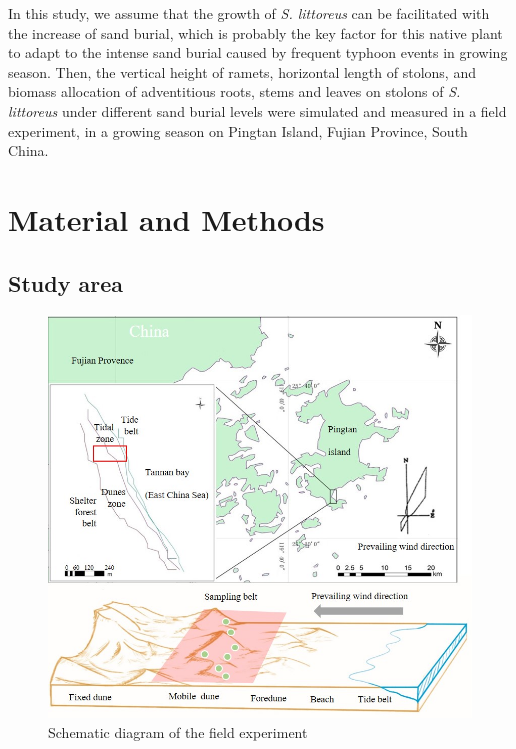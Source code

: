 \documentclass[]{interact}
\theoremstyle{plain}%
\theoremstyle{definition}
\theoremstyle{remark}
\begin{document}
\label{Introduction-5}
In this study, we assume that the growth of \textit{S. littoreus} can be facilitated with the increase of sand burial, which is probably the key factor for this native plant to adapt to the intense sand burial caused by frequent typhoon events in growing season. Then, the vertical height of ramets, horizontal length of stolons, and biomass allocation of adventitious roots, stems and leaves on stolons of \textit{S. littoreus} under different sand burial levels were simulated and measured in a field experiment, in a growing season on Pingtan Island, Fujian Province, South China.


\section{Material and Methods}
\subsection{Study area}

\begin{figure}
  \centering
  \includegraphics[scale=0.8]{../figs/study_area.jpg}
  \caption{Schematic diagram of the field experiment} 
  \label{fig:map}
\end{figure}
\end{document}
